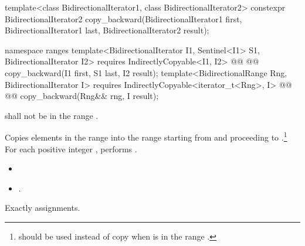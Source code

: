%
\begin{itemdecl}
template<class BidirectionalIterator1, class BidirectionalIterator2>
  constexpr BidirectionalIterator2
    copy_backward(BidirectionalIterator1 first,
                  BidirectionalIterator1 last,
                  BidirectionalIterator2 result);
\end{itemdecl}\begin{addedblock}\begin{itemdecl}
namespace ranges {
  template<BidirectionalIterator I1, Sentinel<I1> S1, BidirectionalIterator I2>
    requires IndirectlyCopyable<I1, I2>
    @@
    @@
      copy_backward(I1 first, S1 last, I2 result);
  template<BidirectionalRange Rng, BidirectionalIterator I>
    requires IndirectlyCopyable<iterator_t<Rng>, I>
    @@
    @@
      copy_backward(Rng&& rng, I result);
}
\end{itemdecl}\end{addedblock}

\begin{itemdescr}
\pnum
\requires
{}
shall not be in the range
.

\pnum
\effects
Copies elements in the range 
into the
range 
starting from
and proceeding to .\footnote{
should be used instead of copy when 
is in
the range
.}
For each positive integer
,
performs
.

\pnum
\returns
\begin{itemize}
\item {}
\item {}
  .
\end{itemize}

\pnum
\complexity
Exactly
assignments.
\end{itemdescr}

